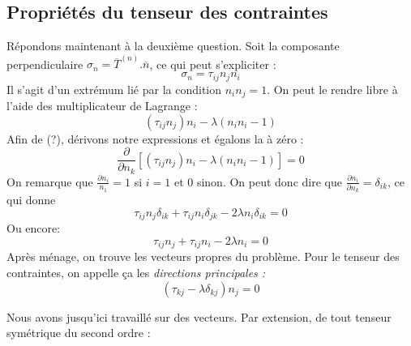     \subsection{Propriétés du tenseur des contraintes}
    Répondons maintenant à la deuxième question. Soit la composante perpendiculaire $\sigma_n 
    = \overline{T}^{(n)}.\overline{n}$, ce qui peut s'expliciter :
    \begin{equation}
    \sigma_n = \tau_{ij}n_jn_i
    \end{equation}
    Il s'agit d'un extrémum lié par la condition $n_in_j=1$. On peut le rendre libre à l'aide des 
    multiplicateur de Lagrange :
    \begin{equation}
    (\tau_{ij}n_j)n_i - \lambda (n_in_i - 1)
    \end{equation}
    Afin de (?), dérivons notre expressions et égalons la à zéro :
    \begin{equation}
    \frac{\partial}{\partial n_k}[(\tau_{ij}n_j)n_i - \lambda (n_in_i - 1)] = 0
    \end{equation}
    On remarque que $\frac{\partial n_i}{n_1} = 1$ si $i=1$ et 0 sinon. On peut donc dire que 
    $\frac{\partial n_i}{\partial n_k} = \delta_{ik}$, ce qui donne 
    \begin{equation}
    \tau_{ij}n_j\delta_{ik} + \tau_{ij}n_i \delta_{jk} - 2\lambda n_i \delta_{ik} = 0
    \end{equation}
    Ou encore:
    \begin{equation}
    \tau_{ij}n_j + \tau_{ij}n_i - 2\lambda n_i  = 0
    \end{equation}
    Après ménage, on trouve les vecteurs propres du problème. Pour le tenseur des contraintes, on appelle
    ça les \textit{directions principales :}
    \begin{equation}
    (\tau_{kj} - \lambda\delta_{kj})n_j = 0
    \end{equation}
    
    Nous avons jusqu'ici travaillé sur des vecteurs. Par extension, de tout tenseur symétrique du second
    ordre :\\
    
    
